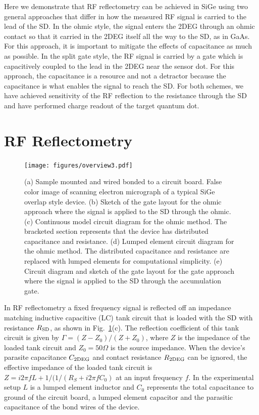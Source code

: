 \documentclass{article}
\begin{document}
	Here we demonstrate that RF reflectometry can be achieved in SiGe using two general approaches that differ in how the measured RF signal is carried to the lead of the SD.  In the ohmic style, the signal enters the 2DEG through an ohmic contact so that it carried in the 2DEG itself all the way to the SD, as in GaAs.  For this approach, it is important to mitigate the effects of capacitance as much as possible.  In the split gate style, the RF signal is carried by a gate which is capacitively coupled to the lead in the 2DEG near the sensor dot.  For this approach, the capacitance is a resource and not a detractor because the capacitance is what enables the signal to reach the SD.  For both schemes, we have achieved sensitivity of the RF reflection to the resistance through the SD and have performed charge readout of the target quantum dot.  
	

\section{RF Reflectometry}
\label{sec:rf_reflectometry}


\begin{figure}[h]
	\texttt{[image: figures/overview3.pdf]}
	\caption{(a) Sample mounted and wired bonded to a circuit board.  False color image of scanning electron micrograph of a typical SiGe overlap style device.  (b) Sketch of the gate layout for the ohmic approach where the signal is applied to the SD through the ohmic.  (c) Continuous model circuit diagram for the ohmic method.  The bracketed section represents that the device has distributed capacitance and resistance.  (d) Lumped element circuit diagram for the ohmic method.  The distributed capacitance and resistance are replaced with lumped elements for computational simplicity. (e) Circuit diagram and sketch of the gate layout for the gate approach where the signal is applied to the SD through the accumulation gate. }
	\label{fig:overview}
\end{figure}


\label{sub:why_sige_is_very_different_from_the_simples_reflectometry}
In RF reflectometry a fixed frequency signal is reflected off an impedance matching inductive capacitive (LC) tank circuit that is loaded with the SD with resistance $R_{\rm SD}$, as shown in Fig.\ \ref{fig:overview}(c). The reflection coefficient of this tank circuit is given by $\Gamma=(Z-Z_0)/(Z+Z_0)$, where $Z$ is the impedance of the loaded tank circuit and $Z_0 = 50 \Omega$ is the source impedance. When the device's parasite capacitance $C_{\rm 2DEG}$ and contact resistance $R_{\rm 2DEG}$ can be ignored, the effective impedance of the loaded tank circuit is $Z = i2\pi fL + 1/(1/(R_S + i2\pi fC_0)$ at an input frequency $f$. In the experimental setup $L$ is a lumped element inductor and $C_0$ represents the total capacitance to ground of the circuit board, a lumped element capacitor and the parasitic capacitance of the bond wires of the device. 
\end{document}
